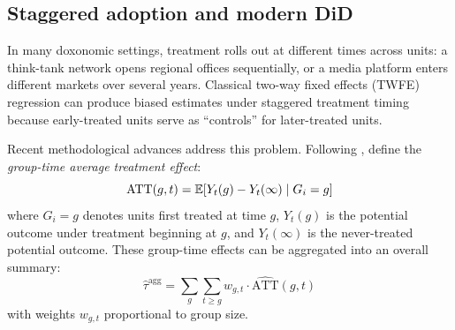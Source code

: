 \begin{center}
\end{center}

\subsection{Staggered adoption and modern DiD}

In many doxonomic settings, treatment rolls out at different times across units: a think-tank network opens regional offices sequentially, or a media platform enters different markets over several years.
Classical two-way fixed effects (TWFE) regression can produce biased estimates under staggered treatment timing because early-treated units serve as ``controls'' for later-treated units.

Recent methodological advances address this problem.
Following \textcite{callaway2021}, define the \emph{group-time average treatment effect}:
\[
  \mathrm{ATT}(g, t) = \mathbb{E}[Y_t(g) - Y_t(\infty) \mid G_i = g]
\]
where $G_i = g$ denotes units first treated at time $g$, $Y_t(g)$ is the potential outcome under treatment beginning at $g$, and $Y_t(\infty)$ is the never-treated potential outcome.
These group-time effects can be aggregated into an overall summary:
\[
  \hat{\tau}^{\text{agg}} = \sum_{g} \sum_{t \geq g} w_{g,t} \cdot \widehat{\mathrm{ATT}}(g, t)
\]
with weights $w_{g,t}$ proportional to group size.

